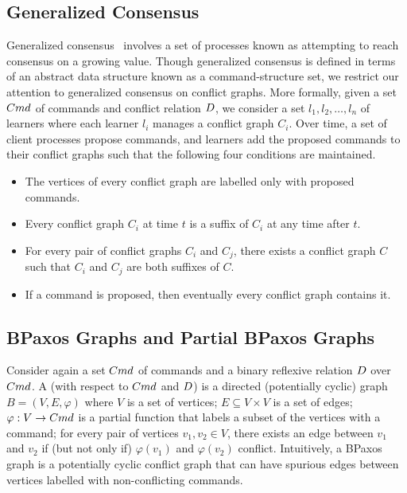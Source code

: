 \subsection{Generalized Consensus}
Generalized consensus~\cite{lamport1998part, sutra2011fast} involves a set of
processes known as  attempting to reach consensus on a
growing value. Though generalized consensus is defined in terms of an abstract
data structure known as a command-structure set, we restrict our attention to
generalized consensus on conflict graphs. More formally, given a set $Cmd$ of
commands and conflict relation $D$, we consider a set $l_1, l_2,
\ldots, l_n$ of learners where each learner $l_i$ manages a conflict graph
$C_i$. Over time, a set of client processes propose commands, and learners add
the proposed commands to their conflict graphs such that the following four
conditions are maintained.
\begin{itemize}
  \item {}
    The vertices of every conflict graph are labelled only with proposed
    commands.
  \item {}
    Every conflict graph $C_i$ at time $t$ is a suffix of $C_i$ at any time after
    $t$.
  \item {}
    For every pair of conflict graphs $C_i$ and $C_j$, there exists a conflict
    graph $C$ such that $C_i$ and $C_j$ are both suffixes of $C$.
  \item {}
    If a command is proposed, then eventually every conflict graph contains it.
\end{itemize}

\subsection{BPaxos Graphs and Partial BPaxos Graphs}


Consider again a set $Cmd$ of commands and a binary reflexive relation
$D$ over $Cmd$. A  (with respect to $Cmd$ and
$D$) is a directed (potentially cyclic) graph $B = (V, E, \varphi)$
where
%
  $V$ is a set of vertices;
%
  $E \subseteq V \times V$ is a set of edges;
%
  $\varphi: V \to Cmd$ is a partial function that labels a subset of the
  vertices with a command;
%
  for every pair of vertices $v_1, v_2 \in V$, there exists an edge between
  $v_1$ and $v_2$ if (but not only if) $\varphi(v_1)$ and $\varphi(v_2)$
  conflict.
%
Intuitively, a BPaxos graph is a potentially cyclic conflict graph that can
have spurious edges between vertices labelled with non-conflicting commands.

